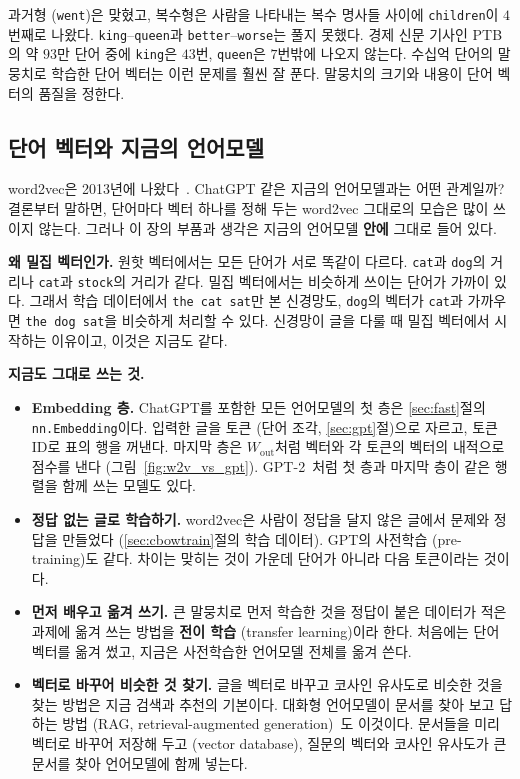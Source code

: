 \documentclass[11pt,a4paper]{article}
\newcommand{\figref}[1]{그림~\ref{fig:#1}}
\newcommand{\w}[1]{\texttt{#1}}
\begin{document}
과거형 (\w{went})은 맞혔고, 복수형은 사람을 나타내는 복수 명사들 사이에 \w{children}이 $4$번째로 나왔다.
\w{king}--\w{queen}과 \w{better}--\w{worse}는 풀지 못했다. 경제 신문 기사인 PTB의 약 $93$만 단어 중에 \w{king}은 $43$번, \w{queen}은 $7$번밖에 나오지 않는다.
수십억 단어의 말뭉치로 학습한 단어 벡터는 이런 문제를 훨씬 잘 푼다. 말뭉치의 크기와 내용이 단어 벡터의 품질을 정한다.

\subsection{단어 벡터와 지금의 언어모델}\label{sec:w2vtoday}

word2vec은 2013년에 나왔다~\cite{mikolov2013a,mikolov2013b}. ChatGPT 같은 지금의 언어모델과는 어떤 관계일까?
결론부터 말하면, 단어마다 벡터 하나를 정해 두는 word2vec 그대로의 모습은 많이 쓰이지 않는다.
그러나 이 장의 부품과 생각은 지금의 언어모델 \textbf{안에} 그대로 들어 있다.

\textbf{왜 밀집 벡터인가.} 원핫 벡터에서는 모든 단어가 서로 똑같이 다르다. \w{cat}과 \w{dog}의 거리나 \w{cat}과 \w{stock}의 거리가 같다.
밀집 벡터에서는 비슷하게 쓰이는 단어가 가까이 있다. 그래서 학습 데이터에서 \w{the cat sat}만 본 신경망도, \w{dog}의 벡터가 \w{cat}과 가까우면 \w{the dog sat}을 비슷하게 처리할 수 있다.
신경망이 글을 다룰 때 밀집 벡터에서 시작하는 이유이고, 이것은 지금도 같다.

\textbf{지금도 그대로 쓰는 것.}
\begin{itemize}[leftmargin=1.5em]
\item \textbf{Embedding 층.} ChatGPT를 포함한 모든 언어모델의 첫 층은 \ref{sec:fast}절의 \texttt{nn.Embedding}이다. 입력한 글을 토큰 (단어 조각, \ref{sec:gpt}절)으로 자르고, 토큰 ID로 표의 행을 꺼낸다.
마지막 층은 $W_{\text{out}}$처럼 벡터와 각 토큰의 벡터의 내적으로 점수를 낸다 (\figref{w2v_vs_gpt}). GPT-2~\cite{radford2019}처럼 첫 층과 마지막 층이 같은 행렬을 함께 쓰는 모델도 있다.
\item \textbf{정답 없는 글로 학습하기.} word2vec은 사람이 정답을 달지 않은 글에서 문제와 정답을 만들었다 (\ref{sec:cbowtrain}절의 학습 데이터). GPT의 사전학습 (pre-training)도 같다. 차이는 맞히는 것이 가운데 단어가 아니라 다음 토큰이라는 것이다.
\item \textbf{먼저 배우고 옮겨 쓰기.} 큰 말뭉치로 먼저 학습한 것을 정답이 붙은 데이터가 적은 과제에 옮겨 쓰는 방법을 \textbf{전이 학습} (transfer learning)이라 한다. 처음에는 단어 벡터를 옮겨 썼고, 지금은 사전학습한 언어모델 전체를 옮겨 쓴다.
\item \textbf{벡터로 바꾸어 비슷한 것 찾기.} 글을 벡터로 바꾸고 코사인 유사도로 비슷한 것을 찾는 방법은 지금 검색과 추천의 기본이다.
대화형 언어모델이 문서를 찾아 보고 답하는 방법 (RAG, retrieval-augmented generation)~\cite{lewis2020}도 이것이다. 문서들을 미리 벡터로 바꾸어 저장해 두고 (vector database), 질문의 벡터와 코사인 유사도가 큰 문서를 찾아 언어모델에 함께 넣는다.
\end{itemize}
\end{document}
